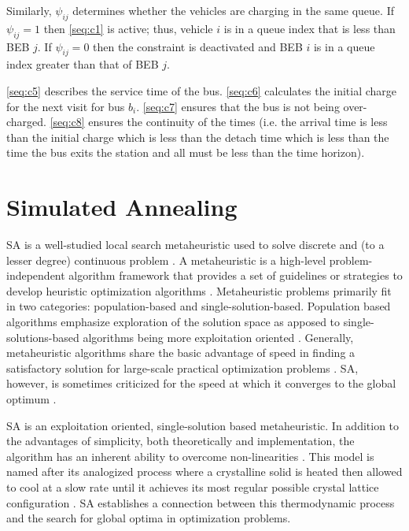 \documentclass[11pt,a4paper,final]{article}
\begin{document}
Similarly, \(\psi_{ij}\) determines whether the vehicles are charging in the same queue. If \(\psi_{ij} = 1\) then \eqref{seq:c1}
is active; thus, vehicle \(i\) is in a queue index that is less than BEB \(j\). If \(\psi_{ij} = 0\) then the constraint is
deactivated and BEB \(i\) is in a queue index greater than that of BEB \(j\).

 \ref{seq:c5} describes the service time of the bus. \ref{seq:c6} calculates the initial charge for the next visit for
bus \(b_i\). \ref{seq:c7} ensures that the bus is not being over-charged. \ref{seq:c8} ensures the continuity of the times
(i.e. the arrival time is less than the initial charge which is less than the detach time which is less than the time
the bus exits the station and all must be less than the time horizon).
\section{Simulated Annealing}
\label{sec:simulated-annealing}
SA is a well-studied local search metaheuristic used to solve discrete and (to a lesser degree) continuous problem
\cite{gendreau-2018-handb-metah}. A metaheuristic is a high-level problem-independent algorithm framework that provides
a set of guidelines or strategies to develop heuristic optimization algorithms \cite{radosavljevic-2018-metah-optim}.
Metaheuristic problems primarily fit in two categories: population-based and single-solution-based. Population based
algorithms emphasize exploration of the solution space as apposed to single-solutions-based algorithms being more
exploitation oriented \cite{radosavljevic-2018-metah-optim}. Generally, metaheuristic algorithms share the basic
advantage of speed in finding a satisfactory solution for large-scale practical optimization problems
\cite{radosavljevic-2018-metah-optim}. SA, however, is sometimes criticized for the speed at which it converges to the
global optimum \cite{gendreau-2018-handb-metah,henderson-1989-theor-pract}.

SA is an exploitation oriented, single-solution based metaheuristic. In addition to the advantages of simplicity, both
theoretically and implementation, the algorithm has an inherent ability to overcome non-linearities
\cite{gendreau-2018-handb-metah,radosavljevic-2018-metah-optim}. This model is named after its analogized process
where a crystalline solid is heated then allowed to cool at a slow rate until it achieves its most regular possible
crystal lattice configuration \cite{henderson-1989-theor-pract}. SA establishes a connection between this thermodynamic
process and the search for global optima in optimization problems.
\end{document}
